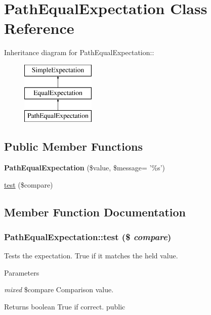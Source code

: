 \hypertarget{class_path_equal_expectation}{
\section{PathEqualExpectation Class Reference}
\label{class_path_equal_expectation}
}
Inheritance diagram for PathEqualExpectation::\begin{figure}[H]
\begin{center}
\leavevmode
\includegraphics[height=3cm]{class_path_equal_expectation}
\end{center}
\end{figure}
\subsection*{Public Member Functions}
\begin{DoxyCompactItemize}
\item 
\hypertarget{class_path_equal_expectation_a9c284d1abae8e7b32bc558418c6468c1}{
{\bfseries PathEqualExpectation} (\$value, \$message= '\%s')}
\label{class_path_equal_expectation_a9c284d1abae8e7b32bc558418c6468c1}

\item 
\hyperlink{class_path_equal_expectation_a8a557e7891f14b36955c89e142cdac95}{test} (\$compare)
\end{DoxyCompactItemize}


\subsection{Member Function Documentation}
\hypertarget{class_path_equal_expectation_a8a557e7891f14b36955c89e142cdac95}{
\subsubsection[{test}]{\setlength{\rightskip}{0pt plus 5cm}PathEqualExpectation::test (\$ {\em compare})}}
\label{class_path_equal_expectation_a8a557e7891f14b36955c89e142cdac95}
Tests the expectation. True if it matches the held value. 
\begin{DoxyParams}{Parameters}
\item[{\em mixed}]\$compare Comparison value. \end{DoxyParams}
\begin{DoxyReturn}{Returns}
boolean True if correct.  public 
\end{DoxyReturn}



